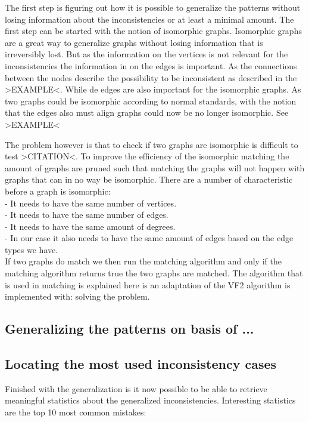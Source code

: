 \documentclass{article}
\begin{document}
The first step is figuring out how it is possible to generalize the patterns without losing information about the inconsistencies or at least a minimal amount. The first step can be started with the notion of isomorphic graphs. Isomorphic graphs are a great way to generalize graphs without losing information that is irreversibly lost. But as the information on the vertices is not relevant for the inconsistencies the information in on the edges is important. As the connections between the nodes describe the possibility to be inconsistent as described in the >EXAMPLE<. While de edges are also important for the isomorphic graphs. As two graphs could be isomorphic according to normal standards, with the notion that the edges also must align graphs could now be no longer isomorphic. See >EXAMPLE<

The problem however is that to check if two graphs are isomorphic is difficult to test >CITATION<. 
To improve the efficiency of the isomorphic matching the amount of graphs are pruned such that matching the graphs will not happen with graphs that can in no way be isomorphic. There are a number of characteristic before a graph is isomorphic:\\
 - It needs to have the same number of vertices.\\
 - It needs to have the same number of edges.\\
 - It needs to have the same amount of degrees.\\
 - In our case it also needs to have the same amount of edges based on the edge types we have.\\
 
If two graphs do match we then run the matching algorithm and only if the matching algorithm returns true the two graphs are matched.
The algorithm that is used in matching is explained here is an adaptation of the VF2 algorithm\cite{LCordella2004} is implemented with: solving the problem. %


\subsection{Generalizing the patterns on basis of ...}


\subsection{Locating the most used inconsistency cases}
Finished with the generalization is it now possible to be able to retrieve meaningful statistics about the generalized inconsistencies. Interesting statistics are the top 10 most common mistakes:
\end{document}
